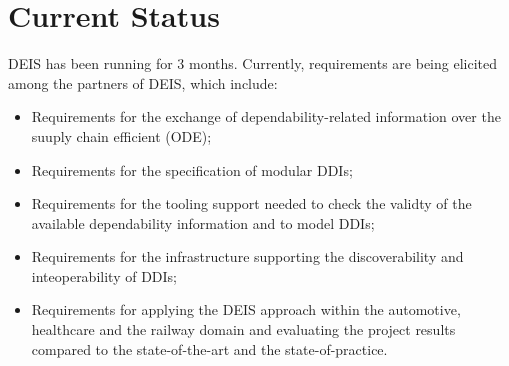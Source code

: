 \section{Current Status}
DEIS has been running for 3 months. Currently, requirements are being elicited among the partners of DEIS, which include:
\begin{itemize}
	\item Requirements for the exchange of dependability-related information over the suuply chain efficient (ODE);
	\item Requirements for the specification of modular DDIs;
	\item Requirements for the tooling support needed to check the validty of the available dependability information and to model DDIs;
	\item Requirements for the infrastructure supporting the discoverability and inteoperability of DDIs;
	\item Requirements for applying the DEIS approach within the automotive, healthcare and the railway domain and evaluating the project results compared to the state-of-the-art and the state-of-practice.
\end{itemize}